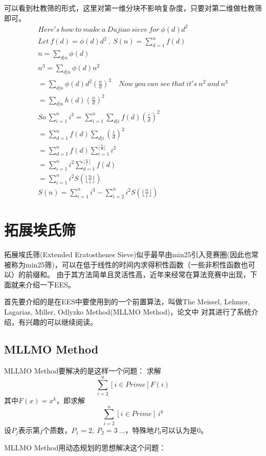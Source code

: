 \begin{solution}
可以看到杜教筛的形式，这里对第一维分块不影响复杂度，只要对第二维做杜教筛即可。
\begin{align*}
Here's\ how\ to\ make\ a\ Dujiao\ sieve\ for\ \phi(d)d^2\\
Let\ f(d)=\phi(d)d^2\ ,\ S(n)=\sum_{d=1}^nf(d)\\
n=\sum_{d|n}\phi(d)\\
n^3=\sum_{d|n}\phi(d)n^2\\
=\sum_{d|n}\phi(d)d^2(\frac n d)^2 \quad Now\ you\ can\ see\ that\ it's\ n^2\ and\ n^3\\ 
=\sum_{d|n}h(d)(\frac n d)^2\\
So\ \sum_{i=1}^n i^3=\sum_{i=1}^n\sum_{d|i}f(d)(\frac i d)^2\\
=\sum_{d=1}^n f(d)\sum_{d|i}(\frac i d)^2\\
=\sum_{d=1}^n f(d)\sum_{i=1}^{\lfloor\frac n d \rfloor}i^2\\
=\sum_{i=1}^n i^2\sum_{d=1}^{\lfloor\frac n i\rfloor}f(d)\\
=\sum_{i=1}^n i^2 S(\lfloor\frac n i\rfloor)\\
S(n)=\sum_{i=1}^n i^3-\sum_{i=2}^ni^2 S(\lfloor\frac n i\rfloor)
\end{align*}
\end{solution}




\section{拓展埃氏筛}
拓展埃氏筛(Extended Eratosthenes Sieve)似乎最早由min25引入竞赛圈(因此也常被称为min25筛)，可以在{\heiti 低于线性的时间}内求得积性函数（一些非积性函数也可以）的前缀和。
由于其方法简单且灵活性高，近年来经常在算法竞赛中出现，下面就来介绍一下EES。

首先要介绍的是在EES中要使用到的一个前置算法，叫做The Meissel, Lehmer, Lagarias, Miller, Odlyzko Method{\heiti (MLLMO Method)}，论文\cite{Deleglise1996Computing}中
对其进行了系统介绍，有兴趣的可以继续阅读。

\subsection{MLLMO Method}
MLLMO Method要解决的是这样一个问题：
求解
$$
\sum_{i=2}^n[i\in Prime]F(i)
$$
其中$F(x) = x^k$，即求解
$$
\sum_{i=2}^n[i\in Prime]\ i^k
$$
设$P_j$表示第$j$个质数，$P_1=2,\ P_2=3\ ...$，特殊地$P_0$可以认为是$0$。

MLLMO Method用动态规划的思想解决这个问题：

